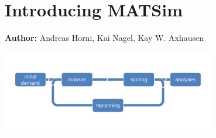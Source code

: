 \chapter{Introducing MATSim}
\label{ch:introducing}
\hfill \textbf{Author:} Andreas Horni, Kai Nagel, Kay W. Axhausen

\begin{center} \includegraphics[width=0.7\textwidth, angle=0]{figures/matsimcycle.pdf} \end{center}

